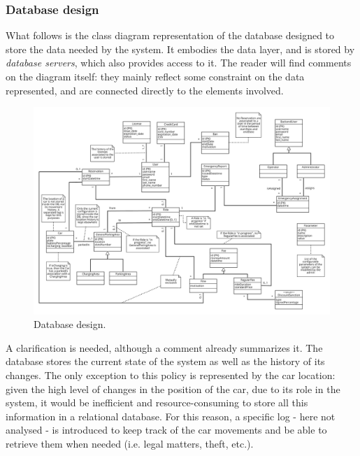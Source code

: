 \subsubsection{Database design}
	What follows is the class diagram representation of the database designed to store the data needed by the system. It embodies the data layer, and is stored by \textit{database servers}, which also provides access to it.\newline
	The reader will find comments on the diagram itself: they mainly reflect some constraint on the data represented, and are connected directly to the elements involved.\newline

	\begin{figure}
		\includegraphics[width=\hsize, center]{img/db_class_diagram.png}
		\caption{Database design.}
	\end{figure}

	\noindent A clarification is needed, although a comment already summarizes it. The database stores the current state of the system as well as the history of its changes. The only exception to this policy is represented by the car location: given the high level of changes in the position of the car, due to its role in the system, it would be inefficient and resource-consuming to store all this information in a relational database. For this reason, a specific log - here not analysed - is introduced to keep track of the car movements and be able to retrieve them when needed (i.e. legal matters, theft, etc.).
\FloatBarrier
